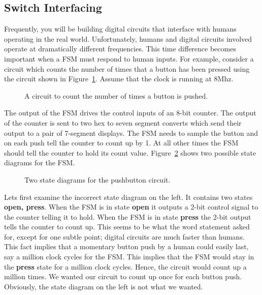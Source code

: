 \subsection{Switch Interfacing}
\label{page:push_dp}
Frequently, you will be building digital circuits that interface with
humans operating in the real world.  Unfortunately, humans and digital
circuits involved operate at dramatically different frequencies.  
This time difference becomes important when a FSM must respond to 
human inputs.  For example, consider a circuit which counts the number
of times that a button has been pressed using the circuit shown in 
Figure~\ref{fig:commonPeripheralComponentspush7button}.  Assume that the clock is running at
8Mhz.

\begin{figure}[ht]
\caption{A circuit to count the number of times a button is pushed.}
\label{fig:commonPeripheralComponentspush7button}
\end{figure}

The output of the FSM drives the control inputs of an 8-bit counter.
The output of the counter is sent to two hex to seven segment converts 
which send their output to a pair of 7-segment displays.
The FSM needs to sample the button and on each push tell the counter
to count up by 1.  At all other times the FSM should tell the counter
to hold its count value.   Figure~\ref{fig:commonPeripheralComponentspushfsm}
shows two possible state diagrams for the FSM.

\begin{figure}[ht]
\caption{Two state diagrams for the pushbutton circuit.}
\label{fig:commonPeripheralComponentspushfsm}
\end{figure}

Lets first examine the incorrect state diagram on the left.  It
contains two states \textbf{ open, press}.  When the FSM is in state
\textbf{ open} it outputs a 2-bit control signal to the counter
telling it to hold.  When the FSM is in state \textbf{ press} the
2-bit output tells the counter to count up.  This seems to be
what the word statement asked for, except for one subtle point; digital
circuits are much faster than humans.  This fact implies that
a momentary button push by a human could easily last, say
a million clock cycles for the FSM.  This implies that the FSM
would stay in the \textbf{ press} state for a million clock cycles.
Hence, the circuit would count up a million times.  We wanted
our circuit to count up once for each button push.  Obviously,
the state diagram on the left is not what we wanted.

